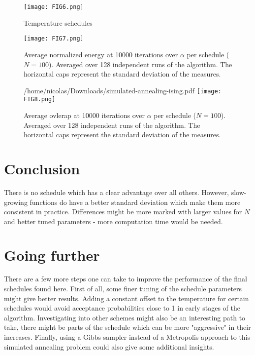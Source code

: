 \documentclass[a4paper]{article}
\begin{document}
\begin{figure}
\centering
\texttt{[image: FIG6.png]}
\caption{\label{fig:FIG6}Temperature schedules}
\end{figure}

\begin{figure}
\centering
\texttt{[image: FIG7.png]}
\caption{\label{fig:FIG7}Average normalized energy at 10000 iterations over $\alpha$ per schedule ($N = 100$). Averaged over 128 independent runs of the algorithm. The horizontal caps represent the standard deviation of the measures.}
\end{figure}

\begin{figure}
\centering/home/nicolas/Downloads/simulated-annealing-ising.pdf
\texttt{[image: FIG8.png]}
\caption{\label{fig:FIG8}Average ovlerap at 10000 iterations over $\alpha$ per schedule ($N = 100$). Averaged over 128 independent runs of the algorithm. The horizontal caps represent the standard deviation of the measures.}
\end{figure}

\section{Conclusion}
There is no schedule which has a clear advantage over all others. However, slow-growing functions do have a better standard deviation which make them more consistent in practice. Differences might be more marked with larger values for $N$ and better tuned parameters - more computation time would be needed.

\section{Going further}
There are a few more steps one can take to improve the performance of the final schedules found here. First of all, some finer tuning of the schedule parameters might give better results. Adding a constant offset to the temperature for certain schedules would avoid acceptance probabilities close to 1 in early stages of the algorithm. Investigating into other schemes might also be an interesting path to take, there might be parts of the schedule which can be more "aggressive" in their increases. Finally, using a Gibbs sampler instead of a Metropolis approach to this simulated annealing problem could also give some additional insights.
\end{document}
